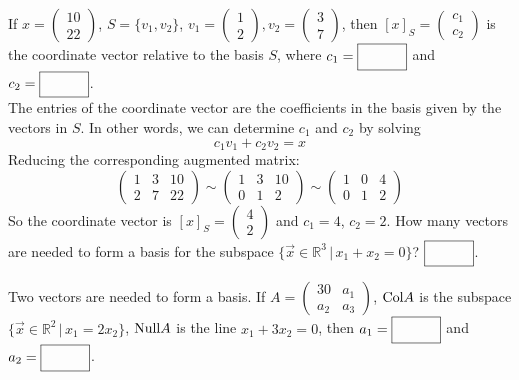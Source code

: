 \ifnum {}
    If $x = \begin{pmatrix} 10\\22\end{pmatrix}$, $S=\{v_1,v_2\}$, $v_1=\begin{pmatrix} 1\\2\end{pmatrix}, v_2 = \begin{pmatrix} 3\\7\end{pmatrix}$, then $[x]_S = \begin{pmatrix} c_1\\c_2\end{pmatrix}$ is the coordinate vector relative to the basis $S$, where $c_1 = \framebox{\strut\hspace{1cm}}$ and $c_2 = \framebox{\strut\hspace{1cm}}$. 
    \ifnum {} {\color{DarkBlue} \\[12pt] The entries of the coordinate vector are the coefficients in the basis given by the vectors in $S$. In other words, we can determine $c_1$ and $c_2$ by solving 
    $$c_1v_1 + c_2v_2 = x$$
    Reducing the corresponding augmented matrix: 
    $$\begin{pmatrix} 1&3&10\\2&7&22\end{pmatrix} 
    \sim \begin{pmatrix} 1&3&10\\0&1&2\end{pmatrix}
    \sim \begin{pmatrix} 1&0&4\\0&1&2\end{pmatrix}$$
    So the coordinate vector is $[x]_S = \begin{pmatrix} 4\\2\end{pmatrix}$ and $c_1 = 4$, $c_2 = 2$. 
    } 
    \fi
\fi 
\ifnum {}
    How many vectors are needed to form a basis for the subspace $\{\vec x \in \mathbb R^3 \, | \, x_1+x_2 = 0\}$? $\framebox{\strut\hspace{1.0cm}}$. 

    \ifnum {} {\color{DarkBlue} Two vectors are needed to form a basis.  } \fi    
\fi 
\ifnum {}
    If $A = \begin{pmatrix} 30&a_1\\a_2&a_3\end{pmatrix}$, $\text{Col} A$ is the subspace $\{ \vec x \in \mathbb R^2 \, | \, x_1 = 2x_2\}$, $\text{Null} A$ is the line $x_1+3x_2=0$, then $a_1 = \framebox{\strut\hspace{1.0cm}}$ and $a_2 = \framebox{\strut\hspace{1.0cm}}$. 
    
